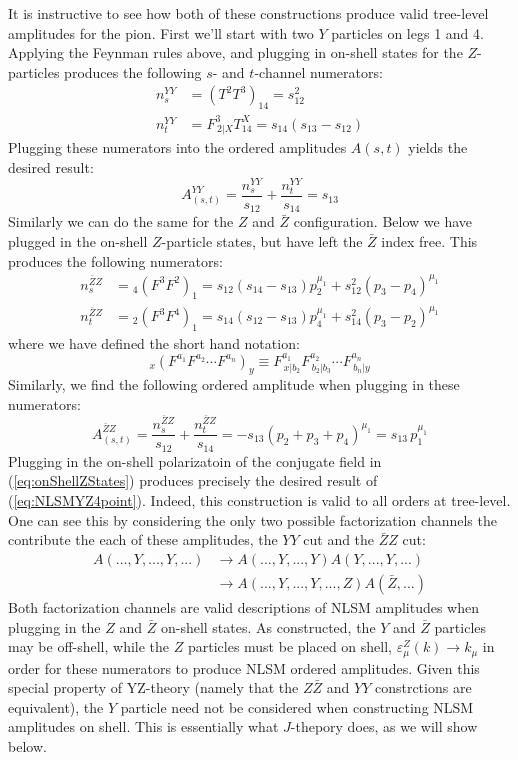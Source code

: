\documentclass[11pt,letter]{article}
\def\eqn#1{(\ref{#1})}
\def\be{\begin{equation}}
\def\ee{\end{equation}}
\begin{document}
It is instructive to see how both of these constructions produce valid tree-level amplitudes for the pion. First we'll start with two $Y$ particles on legs 1 and 4. Applying the Feynman rules above, and plugging in on-shell states for the $Z$-particles produces the following $s$- and $t$-channel numerators:
\begin{align}
n^{YY}_s &= (T^2T^3)_{14} = s_{12}^2 
\\
 n^{YY}_t &=  F^{3}_{\,2|X}T^X_{14}  = s_{14}(s_{13}-s_{12})
\end{align}
Plugging these numerators into the ordered amplitudes $A(s,t)$ yields the desired result:
\be\label{eq:NLSMYZ4point}
A^{YY}_{(s,t)} = \frac{n^{YY}_s}{s_{12}}+\frac{ n^{YY}_t }{s_{14}} = s_{13}
\ee
Similarly we can do the same for the $Z$ and $\bar{Z}$ configuration. Below we have plugged in the on-shell $Z$-particle states, but have left the $\bar{Z}$ index free. This produces the following numerators:
\begin{align}
n^{\bar{Z}Z}_s &= {}_4(F^{3}F^{2})_{1} =  s_{12}(s_{14}-s_{13})p_2^{\mu_1}+s_{12}^2(p_3-p_4)^{\mu_1}
\\
 n^{\bar{Z}Z}_t &=   {}_2(F^{3}F^{4})_{1}  = s_{14}(s_{12}-s_{13})p_4^{\mu_1}+s_{14}^2(p_3-p_2)^{\mu_1}
\end{align}
where we have defined the short hand notation:
\be
{}_x(F^{a_1}F^{a_2}\cdots F^{a_n})_{y} \equiv F^{a_1}_{\,x|b_2}F^{a_2}_{\,b_2|b_3}\cdots F^{a_n}_{\,b_n|y}
\ee
Similarly, we find the following ordered amplitude when plugging in these numerators:
\be
A^{\bar{Z}Z}_{(s,t)} = \frac{n^{\bar{Z}Z}_s}{s_{12}}+\frac{ n^{\bar{Z}Z}_t }{s_{14}} = -s_{13}(p_2+p_3+p_4)^{\mu_1} = s_{13} \,p_1^{\mu_1}
\ee
Plugging in the on-shell polarizatoin of the conjugate field in \eqn{eq:onShellZStates} produces precisely the desired result of \eqn{eq:NLSMYZ4point}. Indeed, this construction is valid to all orders at tree-level. One can see this by considering the only two possible factorization channels the contribute the each of these amplitudes, the $YY$ cut and the $\bar{Z}Z$ cut:
\begin{align}
A(...,Y,...,Y,...) &\rightarrow A(...,Y,...,Y)A(Y,...,Y,...)
\\
&\rightarrow A(...,Y,...,Y,...,Z)A(\bar{Z},...)
\end{align}
Both factorization channels are valid descriptions of NLSM amplitudes when plugging in the $Z$ and $\bar{Z}$ on-shell states. As constructed, the $Y$ and $\bar{Z}$ particles may be off-shell, while the $Z$ particles must be placed on shell, $\varepsilon^Z_\mu(k)\rightarrow k_\mu$ in order for these numerators to produce NLSM ordered amplitudes. Given this special property of YZ-theory (namely that the $Z\bar{Z}$ and $YY$ constrctions are equivalent), the $Y$ particle need not be considered when constructing NLSM amplitudes on shell. This is essentially what $J$-thepory does, as we will show below.
\end{document}
